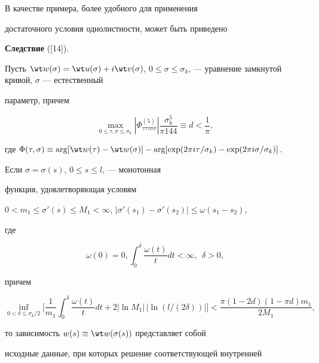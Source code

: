 В качестве примера, более удобного для применения


достаточного условия однолистности, может быть приведено


\medskip





{\bf Следствие} ([14]).


Пусть $\wt w(\sigma) = \wt u(\sigma) + i\wt v(\sigma)$, $0 \leq \sigma


\leq \sigma_k$, --- уравнение замкнутой кривой, $\sigma$ --- естественный


параметр, причем


$$


\max_{0 \leq \tau, \sigma \leq \sigma_k}


|\Phi ^{(5)}_{\tau\tau\tau\sigma \sigma}|


\frac{\sigma_k^5}{\pi 144} \equiv d < \frac{1}{\pi},


$$


где $\Phi(\tau,\sigma) \equiv \arg[\wt w(\tau) - \wt w(\sigma)] -


\arg[\exp (2\pi i \tau/ \sigma_k) - \exp (2\pi i \sigma/ \sigma_k)]$.





Если $\sigma = \sigma (s)$, $0 \leq s \leq l$, --- монотонная


функция, удовлетворяющая условям


$0 < m_1 \leq \sigma'(s) \leq M_1


< \infty$, $|\sigma'(s_1) - \sigma'(s_2)| \leq \omega (s_1 - s_2)$,


где


$$


\omega(0) = 0, \int _0^{\delta} \frac{\omega(t)}{t} dt < \infty,


\ \ \delta > 0,


$$


причем


$$


\inf_{0 < \delta \leq \sigma_k/2} \bigg[\frac{1}{m_1} \int_0^{\delta}


\frac{\omega(t)}{t}dt + 2|\ln M_1|\, |\ln (l/(2 \delta))|\bigg] <


\frac{\pi (1 - 2 d)(1 - \pi d) m_1}{2 M_1},


$$


то зависимость $w(s) \equiv \wt w(\sigma(s))$ представляет собой


исходные данные, при которых решение соответствующей внутренней


